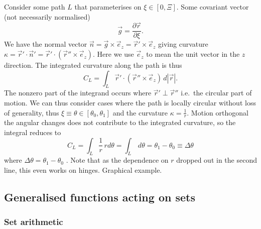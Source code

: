 Consider some path $L$ that parameterises on $\xi \in [0, \Xi]$.
Some covariant vector (not necessarily normalised)
\begin{equation*}
  \vec{g} = \frac{\partial \vec{r}}{\partial \xi}.
\end{equation*}
We have the normal vector $\vec{n} = \vec{g} \times \vec{e}_z = \vec{r}' \times \vec{e}_z$ giving curvature $\kappa = \vec{r}' \cdot \vec{n}' = \vec{r}' \cdot (\vec{r}'' \times \vec{e}_z)$.
Here we use $\vec{e}_z$ to mean the unit vector in the $z$ direction.
The integrated curvature along the path is thus
\begin{equation*}
  C_L = \int_L \vec{r}' \cdot ( \vec{r}'' \times \vec{e}_z ) \, d|\vec{r}|.
\end{equation*}
The nonzero part of the integrand occurs where $\vec{r}' \perp \vec{r}''$ i.e.\ the circular part of motion.
We can thus consider cases where the path is locally circular without loss of generality, thus $\xi \equiv \theta \in [\theta_0, \theta_1]$ and the curvature $\kappa = \tfrac{1}{r}$.
Motion orthogonal the angular changes does not contribute to the integrated curvature, so the integral reduces to
\begin{equation*}
  C_L = \int_L \frac{1}{r} \, r d\theta
  = \int_L \, d\theta
  = \theta_1 - \theta_0 \equiv \Delta\theta
\end{equation*}
where $\Delta\theta = \theta_1 - \theta_0$%
.
Note that as the dependence on $r$ dropped out in the second line, this even works on hinges.
Graphical example.

\subsection{Generalised functions acting on sets}
\subsubsection{Set arithmetic}

